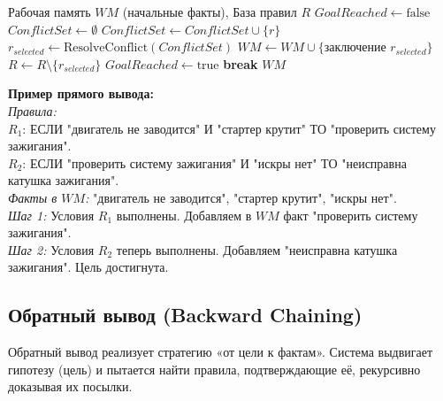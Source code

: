 \documentclass[12pt,a4paper]{article}
\begin{document}
\begin{algorithm}[H]
\caption{Алгоритм прямого логического вывода}
\begin{algorithmic}[1]
\Require Рабочая память $WM$ (начальные факты), База правил $R$
\State $GoalReached \gets \text{false}$
    \State $ConflictSet \gets \emptyset$
            \State $ConflictSet \gets ConflictSet \cup \{r\}$
        \EndIf
    \EndFor
        \State $r_{selected} \gets \text{ResolveConflict}(ConflictSet)$ 
        \State $WM \gets WM \cup \{\text{заключение } r_{selected}\}$
        \State $R \gets R \setminus \{r_{selected}\}$
            \State $GoalReached \gets \text{true}$
        \EndIf
    \Else
        \State \textbf{break} 
    \EndIf
\EndWhile
\Return $WM$
\end{algorithmic}
\end{algorithm}

\textbf{Пример прямого вывода:} \\
\textit{Правила:} \\
$R_1$: ЕСЛИ "двигатель не заводится" И "стартер крутит" ТО "проверить систему зажигания". \\
$R_2$: ЕСЛИ "проверить систему зажигания" И "искры нет" ТО "неисправна катушка зажигания". \\
\textit{Факты в $WM$:} "двигатель не заводится", "стартер крутит", "искры нет". \\
\textit{Шаг 1:} Условия $R_1$ выполнены. Добавляем в $WM$ факт "проверить систему зажигания". \\
\textit{Шаг 2:} Условия $R_2$ теперь выполнены. Добавляем "неисправна катушка зажигания". Цель достигнута.

\subsection{Обратный вывод (Backward Chaining)}

Обратный вывод реализует стратегию «от цели к фактам». Система выдвигает гипотезу (цель) и пытается найти правила, подтверждающие её, рекурсивно доказывая их посылки.
\end{document}

